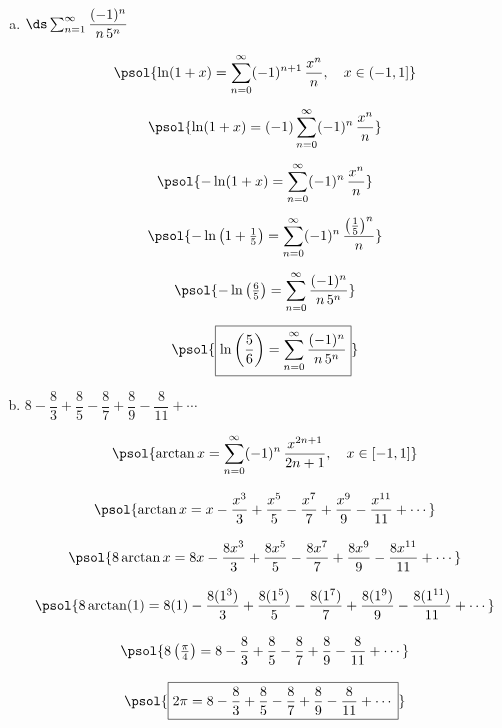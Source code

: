 \documentclass[12pt,letterpaper]{exam}
\begin{document}
\begin{questions}
\begin{enumerate}[(a)]
	\item $\ds\sum_{n=1}^\infty \dfrac{(-1)^n}{n\, 5^n}$ \par\vspace{0.3cm}
		\[
		\begin{gathered}
		\psol{\ln(1 + x)= \sum_{n=0}^\infty (-1)^{n+1} \, \dfrac{x^n}{n}, \quad x \in (-1, 1]} \\[0.2cm]
		\psol{\ln(1 + x)= (-1) \sum_{n=0}^\infty (-1)^n \, \dfrac{x^n}{n}} \\[0.2cm]
		\psol{-\ln(1 + x)= \sum_{n=0}^\infty (-1)^n \, \dfrac{x^n}{n}} \\[0.2cm]
		\psol{-\ln\left(1 + \tfrac{1}{5} \right)= \sum_{n=0}^\infty (-1)^n \, \dfrac{\left( \frac{1}{5} \right)^n}{n}} \\[0.2cm]
		\psol{-\ln\left(\tfrac{6}{5} \right)= \sum_{n=0}^\infty \dfrac{(-1)^n}{n\, 5^n}} \\[0.2cm]
		\psol{\boxed{\ln\left(\dfrac{5}{6} \right)= \sum_{n=0}^\infty \dfrac{(-1)^n}{n\, 5^n}}}
		\end{gathered}
		\] \par\vspace{0.4cm}
	
	\item $8 - \dfrac{8}{3} + \dfrac{8}{5} - \dfrac{8}{7} + \dfrac{8}{9} - \dfrac{8}{11} + \cdots$ \par\vspace{0.3cm}
		\[
		\begin{gathered}
		\psol{\arctan x= \sum_{n=0}^\infty (-1)^n\, \dfrac{x^{2n+1}}{2n + 1}, \quad x \in [-1, 1]} \\[0.3cm]
		\psol{\arctan x= x - \dfrac{x^3}{3} + \dfrac{x^5}{5} - \dfrac{x^7}{7} + \dfrac{x^9}{9} - \dfrac{x^{11}}{11} + \cdots} \\[0.3cm]
		\psol{8\arctan x= 8x - \dfrac{8x^3}{3} + \dfrac{8x^5}{5} - \dfrac{8x^7}{7} + \dfrac{8x^9}{9} - \dfrac{8x^{11}}{11} + \cdots} \\[0.3cm]
		\psol{8 \arctan(1)= 8(1) - \dfrac{8(1^3)}{3} + \dfrac{8(1^5)}{5} - \dfrac{8(1^7)}{7} + \dfrac{8(1^9)}{9} - \dfrac{8(1^{11})}{11} + \cdots} \\[0.3cm]
		\psol{8 \left( \tfrac{\pi}{4} \right)= 8 - \dfrac{8}{3} + \dfrac{8}{5} - \dfrac{8}{7} + \dfrac{8}{9} - \dfrac{8}{11} + \cdots} \\[0.3cm]
		\psol{\boxed{2\pi = 8 - \dfrac{8}{3} + \dfrac{8}{5} - \dfrac{8}{7} + \dfrac{8}{9} - \dfrac{8}{11} + \cdots}}
		\end{gathered}
		\]
	\end{enumerate}




\end{questions}
\end{document}
